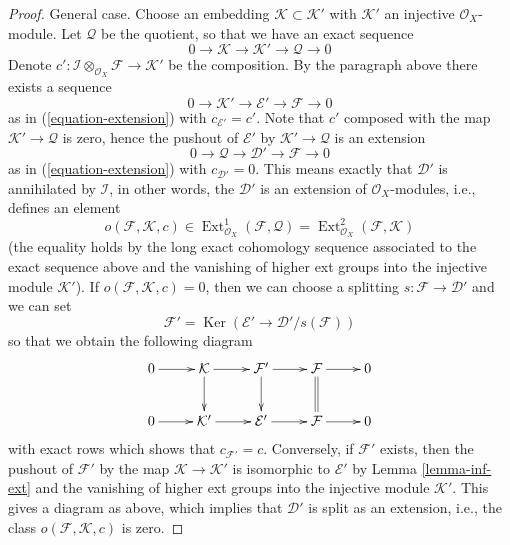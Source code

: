 \documentclass[10pt,a4paper]{amsart}
\theoremstyle{plain}
\theoremstyle{definition}
\theoremstyle{remark}
\numberwithin{equation}{subsection}
\def\Ext{\mathop{\mathrm{Ext}}\nolimits}
\def\Ker{\mathop{\mathrm{Ker}}}
\begin{document}
\begin{proof}
\medskip\noindent
General case. Choose an embedding $\mathcal{K} \subset \mathcal{K}'$
with $\mathcal{K}'$ an injective $\mathcal{O}_X$-module. Let $\mathcal{Q}$
be the quotient, so that we have an exact sequence
$$
0 \to \mathcal{K} \to \mathcal{K}' \to \mathcal{Q} \to 0
$$
Denote
$c' : \mathcal{I} \otimes_{\mathcal{O}_X} \mathcal{F} \to \mathcal{K}'$
be the composition. By the paragraph above there exists a sequence
$$
0 \to \mathcal{K}' \to \mathcal{E}' \to \mathcal{F} \to 0
$$
as in (\ref{equation-extension}) with $c_{\mathcal{E}'} = c'$.
Note that $c'$ composed with the map $\mathcal{K}' \to \mathcal{Q}$
is zero, hence the pushout of $\mathcal{E}'$ by
$\mathcal{K}' \to \mathcal{Q}$ is an extension
$$
0 \to \mathcal{Q} \to \mathcal{D}' \to \mathcal{F} \to 0
$$
as in (\ref{equation-extension}) with $c_{\mathcal{D}'} = 0$.
This means exactly that $\mathcal{D}'$ is annihilated by
$\mathcal{I}$, in other words, the $\mathcal{D}'$ is an extension
of $\mathcal{O}_X$-modules, i.e., defines an element
$$
o(\mathcal{F}, \mathcal{K}, c) \in
\Ext^1_{\mathcal{O}_X}(\mathcal{F}, \mathcal{Q}) =
\Ext^2_{\mathcal{O}_X}(\mathcal{F}, \mathcal{K})
$$
(the equality holds by the long exact cohomology sequence associated
to the exact sequence above and the vanishing of higher ext groups
into the injective module $\mathcal{K}'$). If
$o(\mathcal{F}, \mathcal{K}, c) = 0$, then we can choose a splitting
$s : \mathcal{F} \to \mathcal{D}'$ and we can set
$$
\mathcal{F}' = \Ker(\mathcal{E}' \to \mathcal{D}'/s(\mathcal{F}))
$$
so that we obtain the following diagram
$$
\xymatrix{
0 \ar[r] &
\mathcal{K} \ar[r] \ar[d] &
\mathcal{F}' \ar[r] \ar[d] &
\mathcal{F} \ar[r] \ar@{=}[d] &
0 \\
0 \ar[r] &
\mathcal{K}' \ar[r] &
\mathcal{E}' \ar[r] &
\mathcal{F} \ar[r] & 0
}
$$
with exact rows which shows that $c_{\mathcal{F}'} = c$. Conversely, if
$\mathcal{F}'$ exists, then the pushout of $\mathcal{F}'$ by the map
$\mathcal{K} \to \mathcal{K}'$ is isomorphic to $\mathcal{E}'$ by
Lemma \ref{lemma-inf-ext} and the vanishing of higher ext groups
into the injective module $\mathcal{K}'$. This gives a diagram
as above, which implies that $\mathcal{D}'$ is split as an extension, i.e.,
the class $o(\mathcal{F}, \mathcal{K}, c)$ is zero.
\end{proof}
\end{document}
